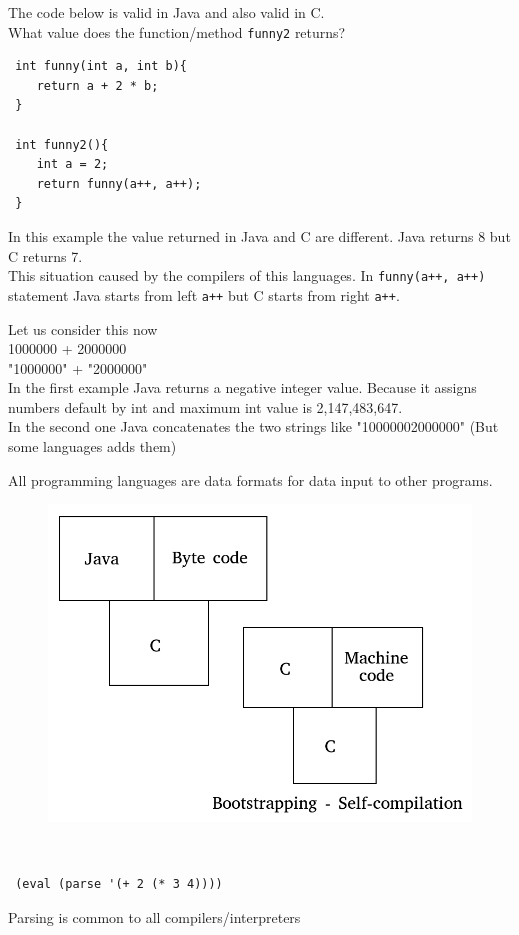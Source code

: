 \documentclass{article}
\begin{document}
\begin{flushleft}
The code below is valid in Java and also valid in C. \\
What value does the function/method \verb|funny2| returns?

\begin{verbatim}
 int funny(int a, int b){
    return a + 2 * b;
 }
 
 int funny2(){
    int a = 2;
    return funny(a++, a++);
 }
\end{verbatim}

In this example the value returned in Java and C are different. Java returns 8 but C returns 7.\\
This situation caused by the compilers of this languages. In \verb|funny(a++, a++)| statement Java starts from left \verb|a++| but C starts from right \verb|a++|.\linebreak

Let us consider this now\\
1000000 + 2000000\\
"1000000" + "2000000"\\
In the first example Java returns a negative integer value. Because it assigns numbers default by int and maximum int value is 2,147,483,647.\\
In the second one Java concatenates the two strings like "10000002000000" (But some languages adds them)\linebreak

All programming languages are data formats for data input to other programs.\\
\begin{figure}[h]
  \includegraphics[scale=0.2]{bootstrapping}
\end{figure}

\\
\begin{verbatim}
 (eval (parse '(+ 2 (* 3 4))))
\end{verbatim}
Parsing is common to all compilers/interpreters


\end{flushleft}
\end{document}
